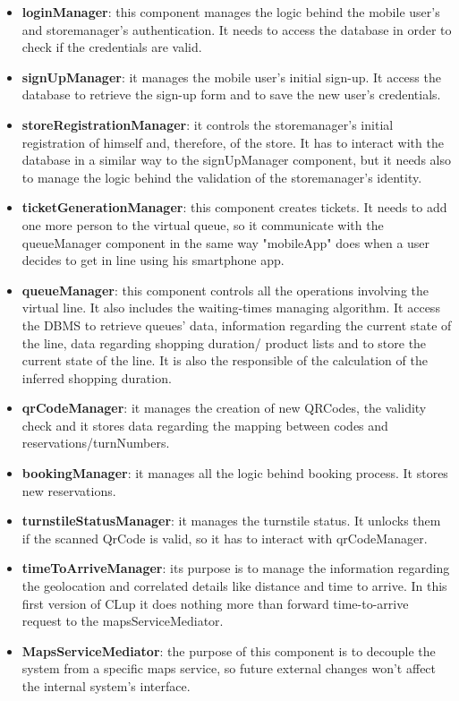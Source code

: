 \documentclass{article}
\begin{document}
\begin{itemize}
\item\textbf{loginManager}: this component manages the logic behind the mobile user's and storemanager's authentication.
It needs to access the database in order to check if the credentials are valid.
\item\textbf{signUpManager}: it manages the mobile user's initial sign-up. It access the database to retrieve the sign-up
form and to save the new user's credentials.
\item\textbf{storeRegistrationManager}: it controls the storemanager's initial registration of himself and, therefore,
of the store. It has to interact with the database in a similar way to the signUpManager component, but it 
needs also to manage the logic behind the validation of the storemanager's identity.
\item\textbf{ticketGenerationManager}: this component creates tickets. It needs to add one more person to the virtual
queue, so it communicate with the queueManager component in the same way "mobileApp" does when
a user decides to get in line using his smartphone app.
\item\textbf{queueManager}: this component controls all the operations involving the virtual line. It also includes
the waiting-times managing algorithm. It access the DBMS to retrieve queues' data, information regarding the current state of the line, data regarding shopping duration/ product lists and to store the current state of the line. It is also the responsible of the calculation of the inferred shopping duration.
\item\textbf{qrCodeManager}: it manages the creation of new QRCodes, the validity check and it stores data regarding
the mapping between codes and reservations/turnNumbers.
\item\textbf{bookingManager}: it manages all the logic behind booking process. It stores new reservations.
\item\textbf{turnstileStatusManager}: it manages the turnstile status. It unlocks them if the scanned QrCode is valid, so
it has to interact with qrCodeManager.
\item\textbf{timeToArriveManager}: its purpose is to manage the information regarding the geolocation and correlated details like distance and time to arrive. In this first version of CLup it does nothing more than forward time-to-arrive request to the mapsServiceMediator.
\item\textbf{MapsServiceMediator}: the purpose of this component is to decouple the system from a specific maps service, so future external changes won't affect the internal system's interface.

\end{itemize}
\end{document}
